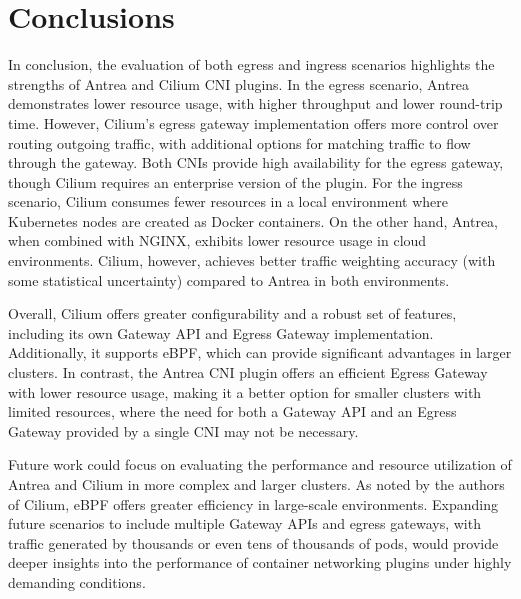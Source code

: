 

\chapter{Conclusions}
\label{char:conclusions}

In conclusion, the evaluation of both egress and ingress scenarios highlights the strengths of Antrea and Cilium CNI plugins. In the egress scenario, Antrea demonstrates lower resource usage, with higher throughput and lower round-trip time. However, Cilium's egress gateway implementation offers more control over routing outgoing traffic, with additional options for matching traffic to flow through the gateway. Both CNIs provide high availability for the egress gateway, though Cilium requires an enterprise version of the plugin. For the ingress scenario, Cilium consumes fewer resources in a local environment where Kubernetes nodes are created as Docker containers. On the other hand, Antrea, when combined with NGINX, exhibits lower resource usage in cloud environments. Cilium, however, achieves better traffic weighting accuracy (with some statistical uncertainty) compared to Antrea in both environments.

 

Overall, Cilium offers greater configurability and a robust set of features, including its own Gateway API and Egress Gateway implementation. Additionally, it supports eBPF, which can provide significant advantages in larger clusters. In contrast, the Antrea CNI plugin offers an efficient Egress Gateway with lower resource usage, making it a better option for smaller clusters with limited resources, where the need for both a Gateway API and an Egress Gateway provided by a single CNI may not be necessary.

Future work could focus on evaluating the performance and resource utilization of Antrea and Cilium in more complex and larger clusters. As noted by the authors of Cilium, eBPF offers greater efficiency in large-scale environments. Expanding future scenarios to include multiple Gateway APIs and egress gateways, with traffic generated by thousands or even tens of thousands of pods, would provide deeper insights into the performance of container networking plugins under highly demanding conditions.